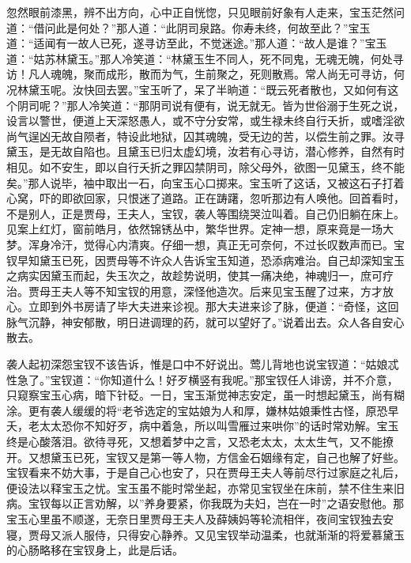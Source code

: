 \begin{parag}
    忽然眼前漆黑，辨不出方向，心中正自恍惚，只见眼前好象有人走来，宝玉茫然问道：“借问此是何处？”那人道：“此阴司泉路。你寿未终，何故至此？”宝玉道：“适闻有一故人已死，遂寻访至此，不觉迷途。”那人道：“故人是谁？”宝玉道：“姑苏林黛玉。”那人冷笑道：“林黛玉生不同人，死不同鬼，无魂无魄，何处寻访！凡人魂魄，聚而成形，散而为气，生前聚之，死则散焉。常人尚无可寻访，何况林黛玉呢。汝快回去罢。”宝玉听了，呆了半晌道：“既云死者散也，又如何有这个阴司呢？”那人冷笑道：“那阴司说有便有，说无就无。皆为世俗溺于生死之说，设言以警世，便道上天深怒愚人，或不守分安常，或生禄未终自行夭折，或嗜淫欲尚气逞凶无故自陨者，特设此地狱，囚其魂魄，受无边的苦，以偿生前之罪。汝寻黛玉，是无故自陷也。且黛玉已归太虚幻境，汝若有心寻访，潜心修养，自然有时相见。如不安生，即以自行夭折之罪囚禁阴司，除父母外，欲图一见黛玉，终不能矣。”那人说毕，袖中取出一石，向宝玉心口掷来。宝玉听了这话，又被这石子打着心窝，吓的即欲回家，只恨迷了道路。正在踌躇，忽听那边有人唤他。回首看时，不是别人，正是贾母，王夫人，宝钗，袭人等围绕哭泣叫着。自己仍旧躺在床上。见案上红灯，窗前皓月，依然锦锈丛中，繁华世界。定神一想，原来竟是一场大梦。浑身冷汗，觉得心内清爽。仔细一想，真正无可奈何，不过长叹数声而已。宝钗早知黛玉已死，因贾母等不许众人告诉宝玉知道，恐添病难治。自己却深知宝玉之病实因黛玉而起，失玉次之，故趁势说明，使其一痛决绝，神魂归一，庶可疗治。贾母王夫人等不知宝钗的用意，深怪他造次。后来见宝玉醒了过来，方才放心。立即到外书房请了毕大夫进来诊视。那大夫进来诊了脉，便道：“奇怪，这回脉气沉静，神安郁散，明日进调理的药，就可以望好了。”说着出去。众人各自安心散去。
\end{parag}


\begin{parag}
    袭人起初深怨宝钗不该告诉，惟是口中不好说出。莺儿背地也说宝钗道：“姑娘忒性急了。”宝钗道：“你知道什么！好歹横竖有我呢。”那宝钗任人诽谤，并不介意，只窥察宝玉心病，暗下针砭。一日，宝玉渐觉神志安定，虽一时想起黛玉，尚有糊涂。更有袭人缓缓的将“老爷选定的宝姑娘为人和厚，嫌林姑娘秉性古怪，原恐早夭，老太太恐你不知好歹，病中着急，所以叫雪雁过来哄你”的话时常劝解。宝玉终是心酸落泪。欲待寻死，又想着梦中之言，又恐老太太，太太生气，又不能撩开。又想黛玉已死，宝钗又是第一等人物，方信金石姻缘有定，自己也解了好些。宝钗看来不妨大事，于是自己心也安了，只在贾母王夫人等前尽行过家庭之礼后，便设法以释宝玉之忧。宝玉虽不能时常坐起，亦常见宝钗坐在床前，禁不住生来旧病。宝钗每以正言劝解，以”养身要紧，你我既为夫妇，岂在一时”之语安慰他。那宝玉心里虽不顺遂，无奈日里贾母王夫人及薛姨妈等轮流相伴，夜间宝钗独去安寝，贾母又派人服侍，只得安心静养。又见宝钗举动温柔，也就渐渐的将爱慕黛玉的心肠略移在宝钗身上，此是后话。
\end{parag}


